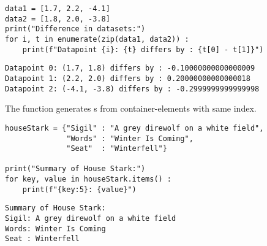 
\begin{frame}[fragile]
%
\begin{codebox}
\begin{verbatim}
data1 = [1.7, 2.2, -4.1]
data2 = [1.8, 2.0, -3.8]
print("Difference in datasets:")
for i, t in enumerate(zip(data1, data2)) :
    print(f"Datapoint {i}: {t} differs by : {t[0] - t[1]}")
\end{verbatim}
\end{codebox}
%
\begin{cmdbox}
\begin{verbatim}
Datapoint 0: (1.7, 1.8) differs by : -0.10000000000000009
Datapoint 1: (2.2, 2.0) differs by : 0.20000000000000018
Datapoint 2: (-4.1, -3.8) differs by : -0.2999999999999998
\end{verbatim}
\end{cmdbox}
%
\begin{hintbox}
The function  generates s from container-elements with same index.
\end{hintbox}
%
\end{frame}


\begin{frame}[fragile]
%
\begin{codebox}
\begin{verbatim}
houseStark = {"Sigil" : "A grey direwolf on a white field",
              "Words" : "Winter Is Coming",
              "Seat"  : "Winterfell"}

print("Summary of House Stark:")
for key, value in houseStark.items() :
    print(f"{key:5}: {value}")
\end{verbatim}
\end{codebox}
%
\begin{cmdbox}
\begin{verbatim}
Summary of House Stark:
Sigil: A grey direwolf on a white field
Words: Winter Is Coming
Seat : Winterfell
\end{verbatim}
\end{cmdbox}
%
\end{frame}

